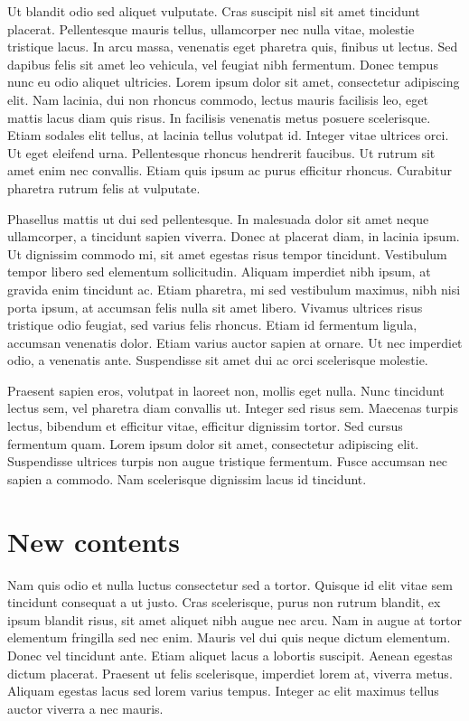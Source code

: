 \documentclass{article}
\begin{document}
Ut blandit odio sed aliquet vulputate. Cras suscipit nisl sit amet tincidunt placerat. Pellentesque mauris tellus, ullamcorper nec nulla vitae, molestie tristique lacus. In arcu massa, venenatis eget pharetra quis, finibus ut lectus. Sed dapibus felis sit amet leo vehicula, vel feugiat nibh fermentum. Donec tempus nunc eu odio aliquet ultricies. Lorem ipsum dolor sit amet, consectetur adipiscing elit. Nam lacinia, dui non rhoncus commodo, lectus mauris facilisis leo, eget mattis lacus diam quis risus. In facilisis venenatis metus posuere scelerisque. Etiam sodales elit tellus, at lacinia tellus volutpat id. Integer vitae ultrices orci. Ut eget eleifend urna. Pellentesque rhoncus hendrerit faucibus. Ut rutrum sit amet enim nec convallis. Etiam quis ipsum ac purus efficitur rhoncus. Curabitur pharetra rutrum felis at vulputate.

Phasellus mattis ut dui sed pellentesque. In malesuada dolor sit amet neque ullamcorper, a tincidunt sapien viverra. Donec at placerat diam, in lacinia ipsum. Ut dignissim commodo mi, sit amet egestas risus tempor tincidunt. Vestibulum tempor libero sed elementum sollicitudin. Aliquam imperdiet nibh ipsum, at gravida enim tincidunt ac. Etiam pharetra, mi sed vestibulum maximus, nibh nisi porta ipsum, at accumsan felis nulla sit amet libero. Vivamus ultrices risus tristique odio feugiat, sed varius felis rhoncus. Etiam id fermentum ligula, accumsan venenatis dolor. Etiam varius auctor sapien at ornare. Ut nec imperdiet odio, a venenatis ante. Suspendisse sit amet dui ac orci scelerisque molestie.

Praesent sapien eros, volutpat in laoreet non, mollis eget nulla. Nunc tincidunt lectus sem, vel pharetra diam convallis ut. Integer sed risus sem. Maecenas turpis lectus, bibendum et efficitur vitae, efficitur dignissim tortor. Sed cursus fermentum quam. Lorem ipsum dolor sit amet, consectetur adipiscing elit. Suspendisse ultrices turpis non augue tristique fermentum. Fusce accumsan nec sapien a commodo. Nam scelerisque dignissim lacus id tincidunt.

\section{New contents}

Nam quis odio et nulla luctus consectetur sed a tortor. Quisque id elit vitae sem tincidunt consequat a ut justo. Cras scelerisque, purus non rutrum blandit, ex ipsum blandit risus, sit amet aliquet nibh augue nec arcu. Nam in augue at tortor elementum fringilla sed nec enim. Mauris vel dui quis neque dictum elementum. Donec vel tincidunt ante. Etiam aliquet lacus a lobortis suscipit. Aenean egestas dictum placerat. Praesent ut felis scelerisque, imperdiet lorem at, viverra metus. Aliquam egestas lacus sed lorem varius tempus. Integer ac elit maximus tellus auctor viverra a nec mauris.
\end{document}
